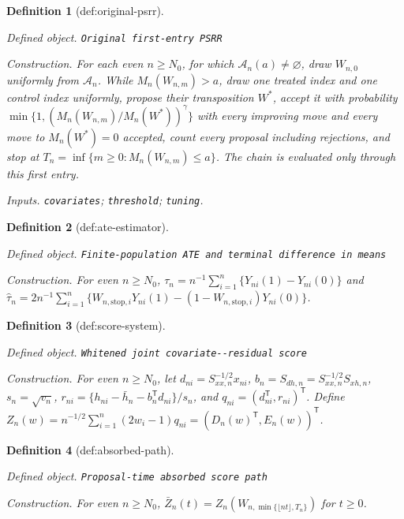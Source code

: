 \documentclass{article}
\newtheorem{definition}{Definition}
\begin{document}
\begin{definition}[def:original-psrr]\label{def:original-psrr}
\par\smallskip\noindent\emph{Defined object.} \texttt{Original first-\allowbreak{}entry PSRR}
\par\smallskip\noindent\emph{Construction.} For each even \(n\ge N_0\), for which \(\mathcal A_n(a)\neq\varnothing\), draw \(W_{n,0}\) uniformly from \(\mathcal A_n\). While \(M_n(W_{n,m})>a\), draw one treated index and one control index uniformly, propose their transposition \(W^*\), accept it with probability \(\min\{1,(M_n(W_{n,m})/M_n(W^*))^{\gamma}\}\) with every improving move and every move to \(M_n(W^*)=0\) accepted, count every proposal including rejections, and stop at \(T_n=\inf\{m\ge0:M_n(W_{n,m})\le a\}\). The chain is evaluated only through this first entry.
\par\smallskip\noindent\emph{Inputs.} \texttt{covariates}; \texttt{threshold}; \texttt{tuning}.
\end{definition}

\begin{definition}[def:ate-estimator]\label{def:ate-estimator}
\par\smallskip\noindent\emph{Defined object.} \texttt{Finite-\allowbreak{}population ATE and terminal difference in means}
\par\smallskip\noindent\emph{Construction.} For even \(n\ge N_0\), \(\tau_n=n^{-1}\sum_{i=1}^n\{Y_{ni}(1)-Y_{ni}(0)\}\) and \(\widehat\tau_n=2n^{-1}\sum_{i=1}^n\{W_{n,\mathrm{stop},i}Y_{ni}(1)-(1-W_{n,\mathrm{stop},i})Y_{ni}(0)\}\).
\end{definition}

\begin{definition}[def:score-system]\label{def:score-system}
\par\smallskip\noindent\emph{Defined object.} \texttt{Whitened joint covariate-\allowbreak{}-\allowbreak{}residual score}
\par\smallskip\noindent\emph{Construction.} For even \(n\ge N_0\), let \(d_{ni}=S_{xx,n}^{-1/2}x_{ni}\), \(b_n=S_{dh,n}=S_{xx,n}^{-1/2}S_{xh,n}\), \(s_n=\sqrt{v_n}\), \(r_{ni}=\{h_{ni}-\bar h_n-b_n^{\mathsf T}d_{ni}\}/s_n\), and \(q_{ni}=(d_{ni}^{\mathsf T},r_{ni})^{\mathsf T}\). Define \(Z_n(w)=n^{-1/2}\sum_{i=1}^n(2w_i-1)q_{ni}=(D_n(w)^{\mathsf T},E_n(w))^{\mathsf T}\).
\end{definition}

\begin{definition}[def:absorbed-path]\label{def:absorbed-path}
\par\smallskip\noindent\emph{Defined object.} \texttt{Proposal-\allowbreak{}time absorbed score path}
\par\smallskip\noindent\emph{Construction.} For even \(n\ge N_0\), \(\bar Z_n(t)=Z_n(W_{n,\min\{\lfloor nt\rfloor,T_n\}})\) for \(t\ge0\).
\end{definition}
\end{document}
